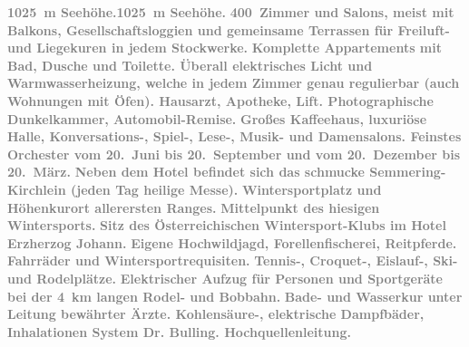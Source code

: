 \begin{ledgroupsized}[t]{13cm}
           \noindent{}\textcolor{gray}{\textbf{1025 m Seehöhe.}}\hfill \textcolor{gray}{\textbf{1025 m Seehöhe.}}\pend
           \pstart
           \centering{}\textcolor{gray}{\textbf{400 Zimmer und Salons, meist mit Balkons, Gesellschaftsloggien
                  und gemeinsame Terrassen für Freiluft- und Liegekuren in jedem Stockwerke.}}\pend
           \pstart
           \noindent{}\centering{}\textcolor{gray}{\textbf{Komplette Appartements mit Bad, Dusche und Toilette. Überall
                  elektrisches Licht und Warmwasserheizung, welche in jedem Zimmer genau regulierbar
                  (auch Wohnungen mit Öfen). Hausarzt, Apotheke, Lift. Photographische Dunkelkammer,
                  Automobil-Remise.}}\pend
           \pstart
           \noindent{}\centering{}\textcolor{gray}{\textbf{Großes Kaffeehaus, luxuriöse Halle, Konversations-, Spiel-,
                  Lese-, Musik- und Damensalons. Feinstes Orchester vom 20. Juni bis 20. September
                  und vom 20. Dezember bis 20. März.}}\pend
           \pstart
           \noindent{}\centering{}\textcolor{gray}{\textbf{Neben dem Hotel befindet sich das schmucke Semmering-Kirchlein (jeden Tag heilige Messe).}}\pend
           \pstart
           \noindent{}\centering{}\textcolor{gray}{\textbf{Wintersportplatz und Höhenkurort allerersten Ranges.}}\pend
           \pstart
           \noindent{}\centering{}\textcolor{gray}{\textbf{Mittelpunkt des hiesigen Wintersports.}}\pend
           \pstart
           \noindent{}\centering{}\textcolor{gray}{\textbf{Sitz des Österreichischen
                     Wintersport-Klubs im Hotel Erzherzog
                     Johann.}}\pend
           \pstart
           \noindent{}\centering{}\textcolor{gray}{\textbf{Eigene Hochwildjagd, Forellenfischerei, Reitpferde. Fahrräder
                  und Wintersportrequisiten.}}\pend
           \pstart
           \noindent{}\centering{}\textcolor{gray}{\textbf{Tennis-, Croquet-, Eislauf-, Ski- und Rodelplätze.}}\pend
           \pstart
           \noindent{}\centering{}\textcolor{gray}{\textbf{Elektrischer Aufzug für Personen und Sportgeräte bei der 4 km
                  langen Rodel- und Bobbahn.}}\pend
           \pstart
           \noindent{}\centering{}\textcolor{gray}{\textbf{Bade- und Wasserkur unter Leitung bewährter Ärzte. Kohlensäure-,
                  elektrische Dampfbäder, Inhalationen System Dr. Bulling. Hochquellenleitung.}}\pend

\end{ledgroupsized}
